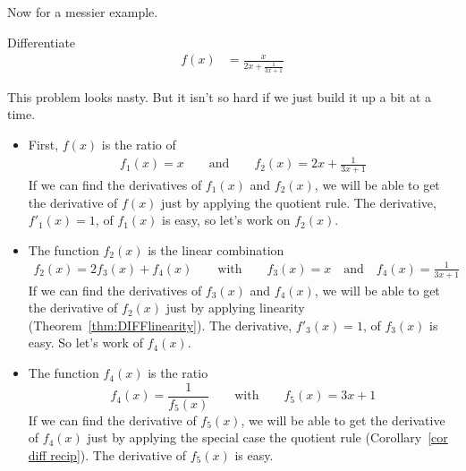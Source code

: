 Now for a messier example.
\begin{eg}\label{eg:DIFFsimpleToolsNA}
Differentiate
\begin{align*}
f(x)&=\frac{x}{2x+\frac{1}{3x+1}}
\end{align*}

This problem looks nasty. But it isn't so hard if we just
build it up a bit at a time.
\begin{itemize}
 \item First, $f(x)$ is the ratio of
\begin{align*}
f_1(x)=x\qquad\text{and}\qquad f_2(x)=2x+\frac{1}{3x+1}
\end{align*}
If we can find the derivatives of $f_1(x)$ and $f_2(x)$, we will be able
to get the derivative of $f(x)$ just by applying the quotient rule. The derivative,
$f'_1(x)=1$, of $f_1(x)$ is easy, so let's work on  $f_2(x)$.

\item The function $f_2(x)$ is the linear combination
\begin{align*}
f_2(x)=2f_3(x)+f_4(x)\qquad\text{with}\qquad
f_3(x)=x \quad\text{and}\quad f_4(x)= \frac{1}{3x+1}
\end{align*}
If we can find the derivatives of $f_3(x)$ and $f_4(x)$, we will be able
to get the derivative of $f_2(x)$ just by applying linearity
(Theorem~\ref{thm:DIFFlinearity}). The derivative, $f'_3(x)=1$, of $f_3(x)$ is easy.
So let's work of $f_4(x)$.
\item The function $f_4(x)$ is the ratio
\begin{equation*}
f_4(x)=\frac{1}{f_5(x)}\qquad\text{with}\qquad f_5(x)=3x+1
\end{equation*}
If we can find the derivative of $f_5(x)$, we will be able to get
the derivative of $f_4(x)$ just by applying the special case
the quotient rule (Corollary~\ref{cor diff recip}). The derivative of
$f_5(x)$ is easy.


\end{itemize}
\end{eg}
